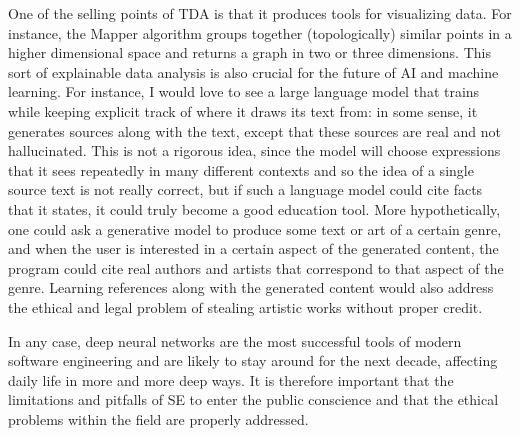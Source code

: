 \documentclass[11pt, oneside]{article}
\begin{document}
One of the selling points of TDA is that it produces tools for visualizing data. For instance, the Mapper algorithm groups together (topologically) similar points in a higher dimensional space and returns a graph in two or three dimensions. This sort of explainable data analysis is also crucial for the future of AI and machine learning. For instance, I would love to see a large language model that trains while keeping explicit track of where it draws its text from: in some sense, it generates sources along with the text, except that these sources are real and not hallucinated. This is not a rigorous idea, since the model will choose expressions that it sees repeatedly in many different contexts and so the idea of a single source text is not really correct, but if such a language model could cite facts that it states, it could truly become a good education tool. More hypothetically, one could ask a generative model to produce some text or art of a certain genre, and when the user is interested in a certain aspect of the generated content, the program could cite real authors and artists that correspond to that aspect of the genre. Learning references along with the generated content would also address the ethical and legal problem of stealing artistic works without proper credit.

In any case, deep neural networks are the most successful tools of modern software engineering and are likely to stay around for the next decade, affecting daily life in more and more deep ways. It is therefore important that the limitations and pitfalls of SE to enter the public conscience and that the ethical problems within the field are properly addressed.
\end{document}
